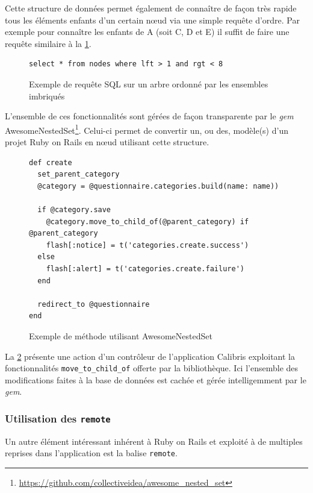 \documentclass[12pt,a4paper]{book}
\begin{document}
Cette structure de données permet également de connaître de façon très rapide tous les éléments enfants d'un certain nœud via une simple requête d'ordre. Par exemple pour connaître les enfants de A (soit C, D et E) il suffit de faire une requête similaire à la \cref{fig.nestedsql}.

\begin{figure}[h]
\lstset{language=sql}
\begin{lstlisting}
select * from nodes where lft > 1 and rgt < 8
\end{lstlisting}
 \caption{Exemple de requête SQL sur un arbre ordonné par les ensembles imbriqués}
 \label{fig.nestedsql}
\end{figure}

L'ensemble de ces fonctionnalités sont gérées de façon transparente par le \textit{gem} AwesomeNestedSet\footnote{\url{https://github.com/collectiveidea/awesome_nested_set}}. Celui-ci permet de convertir un, ou des, modèle(s) d'un projet Ruby on Rails en nœud utilisant cette structure.

\begin{figure}[h]
\lstset{language=ruby}
\begin{lstlisting}
def create
  set_parent_category
  @category = @questionnaire.categories.build(name: name))

  if @category.save
    @category.move_to_child_of(@parent_category) if @parent_category
    flash[:notice] = t('categories.create.success')
  else
    flash[:alert] = t('categories.create.failure')
  end

  redirect_to @questionnaire
end
\end{lstlisting}
 \caption{Exemple de méthode utilisant AwesomeNestedSet}
 \label{fig.nestedrail}
\end{figure}

La \cref{fig.nestedrail} présente une action d'un contrôleur de l'application Calibris exploitant la fonctionnalités \texttt{move\_to\_child\_of} offerte par la bibliothèque. Ici l'ensemble des modifications faites à la base de données est cachée et gérée intelligemment par le \textit{gem}.

\subsubsection{Utilisation des \texttt{remote}}

Un autre élément intéressant inhérent à Ruby on Rails et exploité à de multiples reprises dans l'application est la balise \texttt{remote}.
\end{document}
